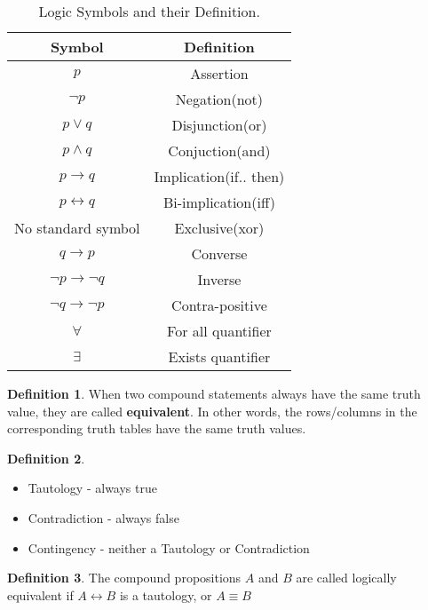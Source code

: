 \documentclass{article}
\theoremstyle{definition}
\newtheorem*{defi}{Definition}
\theoremstyle{definition}
\theoremstyle{named}
\begin{document}
\begin{table}[!ht]
\begin{center}
\centering
    \begin{tabular}[t]{|c|c|}
        \hline Symbol & Definition \\ \hline 
         $p$  & Assertion \\
         $\neg p$ & Negation(not) \\ 
         $p \lor q$ & Disjunction(or) \\ 
         $p \land q$ & Conjuction(and) \\
         $p \rightarrow q$ & Implication(if.. then) \\
         $p \leftrightarrow q$ & Bi-implication(iff) \\
         No standard symbol & Exclusive(xor) \\
         $q \rightarrow p$ & Converse \\
         $\neg p \rightarrow \neg q$ & Inverse \\
         $\neg q \rightarrow \neg p$ & Contra-positive \\
         $\forall$ & For all quantifier \\
         $\exists$ & Exists quantifier \\
         \hline
         
    \end{tabular}
    \caption{\label{abc}Logic Symbols and their Definition.}
\end{center}
\end{table}

\begin{defi}
    When two compound statements
always have the same truth value, they are called
\textbf{equivalent}. In other words, the rows/columns in the
corresponding truth tables have the same truth
values.
\end{defi}

\begin{defi}
    \begin{itemize}
        \item Tautology - always true
        \item Contradiction - always false
        \item Contingency - neither a Tautology or Contradiction
    \end{itemize}
\end{defi}

\begin{defi}
    The compound propositions $A$ and $B$ are called logically equivalent if $A \leftrightarrow B$ is a tautology, or $A \equiv B$
\end{defi}
\end{document}
